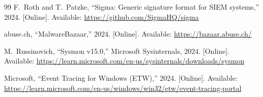 \documentclass[10pt,a4paper,twocolumn]{article}
\begin{document}
\begin{thebibliography}{99}
F.~Roth and T.~Patzke,
``Sigma: Generic signature format for SIEM systems,'' 2024.
[Online]. Available: \url{https://github.com/SigmaHQ/sigma}

abuse.ch,
``MalwareBazaar,'' 2024.
[Online]. Available: \url{https://bazaar.abuse.ch/}

M.~Russinovich,
``Sysmon v15.0,''
Microsoft Sysinternals, 2024.
[Online]. Available: \url{https://learn.microsoft.com/en-us/sysinternals/downloads/sysmon}

Microsoft,
``Event Tracing for Windows (ETW),'' 2024.
[Online]. Available: \url{https://learn.microsoft.com/en-us/windows/win32/etw/event-tracing-portal}

\end{thebibliography}
\end{document}
